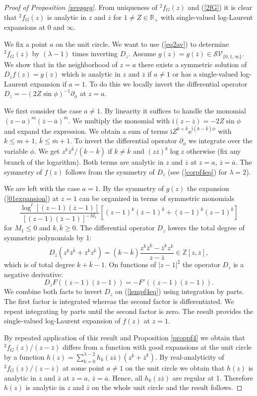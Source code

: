 \documentclass[oneside]{amsart}
\newcommand{\RR}{{\mathbb R}}
\newcommand{\ZZ}{{\mathbb Z}}
\newcommand{\ee}{\mathrm{e}}
\newcommand{\ii}{\mathrm{i}}
\newcommand{\aaa}{{\overline{a}}}
\newcommand{\kk}{{\overline{k}}}
\newcommand{\mm}{{\overline{m}}}
\newcommand{\zz}{{\overline{z}}}
\newcommand{\sS}{\mathcal{S}}
\newcommand{\sV}{\mathcal{V}}
\theoremstyle{plain}
\begin{document}
\begin{proof}[Proof of Proposition \ref{propgeg}]
From uniqueness of ${}^2\!f_G(z)$ and (\ref{2fG}) it is clear that ${}^2\!f_G(z)$ is analytic in $z$ and $\zz$ for $1\neq Z\in\RR_+$ with single-valued log-Laurent expansions at 0 and $\infty$.

We fix a point $a$ on the unit circle. We want to use (\ref{eq2av}) to determine ${}^2\!f_G(z)$ by $(\lambda-1)$ times inverting $D_z$.
Assume $g(z)=g(\zz)\in\sS\sV_{\{0,1,\infty\}}$. We show that in the neighborhood of $z=a$ there exists a symmetric solution of $D_zf(z)=g(z)$ which is analytic in $z$ and $\zz$
if $a\neq1$ or has a single-valued log-Laurent expansion if $a=1$. To do this we locally invert the differential operator $D_z=-(2Z\sin\phi)^{-1}\partial_\phi$ at $z=a$.

We first consider the case $a\neq1$. By linearity it suffices to handle the monomial $(z-a)^m(\zz-\aaa)^\mm$.
We multiply the monomial with $\ii(z-\zz)=-2Z\sin\phi$ and expand the expression. We obtain a sum of terms
$\ii Z^{k+\kk}\ee^{\ii(k-\kk)\phi}$ with $k\leq m+1$, $\kk\leq\mm+1$. To invert the differential operator $\partial_\phi$ we integrate over the variable $\phi$.
We get $z^k\zz^\kk/(k-\kk)$ if $k\neq\kk$ and $(z\zz)^k\log z$ otherwise (fix any branch of the logarithm). Both terms are analytic in $z$ and $\zz$ at $z=a$, $\zz=\aaa$.
The symmetry of $f(z)$ follows from the symmetry of $D_z$ (see (\ref{corpf4eq}) for $\lambda=2$).

We are left with the case $a=1$. By the symmetry of $g(z)$ the expansion (\ref{01expansion}) at $z=1$ can be organized in terms of symmetric monomials
\begin{equation}\label{lempf4eq}
\frac{\log^\ell[(z-1)(\zz-1)]}{[(z-1)(\zz-1)]^{-M_1}}\left[(z-1)^k(\zz-1)^\kk+(\zz-1)^k(z-1)^\kk\right]
\end{equation}
for $M_1\leq0$ and $k,\kk\geq0$. The differential operator $D_z$ lowers the total degree of symmetric polynomials by 1:
\begin{equation}\label{Dzsym}
D_z(z^k\zz^\kk+\zz^kz^\kk)=(k-\kk)\frac{z^k\zz^\kk-\zz^kz^\kk}{z-\zz}\in\ZZ[z,\zz],
\end{equation}
which is of total degree $k+\kk-1$. On functions of $|z-1|^2$ the operator $D_z$ is a negative derivative:
$$
D_zF((z-1)(\zz-1))=-F'((z-1)(\zz-1)).
$$
We combine both facts to invert $D_z$ on (\ref{lempf4eq}) using integration by parts. The first factor is integrated whereas the second factor is differentiated.
We repeat integrating by parts until the second factor is zero. The result provides the single-valued log-Laurent expansion of $f(z)$ at $z=1$.

By repeated application of this result and Proposition \ref{proppf4} we obtain that ${}^2\!f_G(z)/(z-\zz)$ differs from a function with good expansions at the unit circle by
a function $h(z)=\sum_{k=0}^{\lambda-2}h_k(z\zz)(z^k+\zz^k)$. By real-analyticity of ${}^2\!f_G(z)/(z-\zz)$ at some point $a\neq1$ on the unit circle we obtain
that $h(z)$ is analytic in $z$ and $\zz$ at $z=a$, $\zz=\aaa$. Hence, all $h_k(z\zz)$ are regular at 1. Therefore $h(z)$ is analytic in $z$ and $\zz$ on the whole unit circle and the result follows.
\end{proof}
\end{document}
